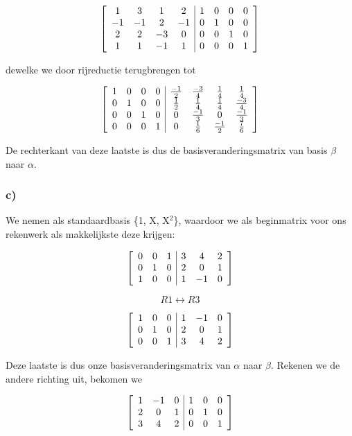 \documentclass[lineaire_algebra_oplossingen.tex]{subfiles}
\begin{document}
\[
\left[
\begin{array}{ c c c c | c c c c }
1 & 3 & 1 & 2 & 1 & 0 & 0 & 0\\
-1 & -1 & 2 & -1 & 0 & 1 & 0 & 0\\
2 & 2 & -3 & 0 & 0 & 0 & 1 & 0\\
1 & 1 & -1 & 1 & 0 & 0 & 0 & 1
\end{array}
\right]
\]

dewelke we door rijreductie terugbrengen tot

\[
\left[
\begin{array}{ c c c c | c c c c }
1 & 0 & 0 & 0 & \frac{-1}{2} & \frac{-3}{4} & \frac{1}{4} & \frac{1}{4}\\
0 & 1 & 0 & 0 & \frac{1}{2} & \frac{1}{4} & \frac{1}{4} & \frac{-3}{4}\\
0 & 0 & 1 & 0 & 0 & \frac{-1}{3} & 0 & \frac{-1}{3}\\
0 & 0 & 0 & 1 & 0 & \frac{1}{6} & \frac{-1}{2} & \frac{7}{6}
\end{array}
\right]
\]

De rechterkant van deze laatste is dus de basisveranderingsmatrix van basis $\beta$ naar $\alpha$.

\subsubsection*{c)}
We nemen als standaardbasis \{1, X, X$^2$\}, waardoor we als beginmatrix voor ons rekenwerk als makkelijkste deze krijgen:

\[
\left[
\begin{array}{ c c c | c c c }
0 & 0 & 1 & 3 & 4 & 2\\
0 & 1 & 0 & 2 & 0 & 1\\
1 & 0 & 0 & 1 & -1 & 0
\end{array}
\right]
\]

\[R1 \leftrightarrow R3 \]

\[
\left[
\begin{array}{ c c c | c c c }
1 & 0 & 0 & 1 & -1 & 0\\
0 & 1 & 0 & 2 & 0 & 1\\
0 & 0 & 1 & 3 & 4 & 2
\end{array}
\right]
\]

Deze laatste is dus onze basisveranderingsmatrix van $\alpha$ naar $\beta$. Rekenen we de andere richting uit, bekomen we

\[
\left[
\begin{array}{ c c c | c c c }
1 & -1 & 0 & 1 & 0 & 0\\
2 & 0 & 1 & 0 & 1 & 0\\
3 & 4 & 2 & 0 & 0 & 1
\end{array}
\right]
\]
\end{document}
